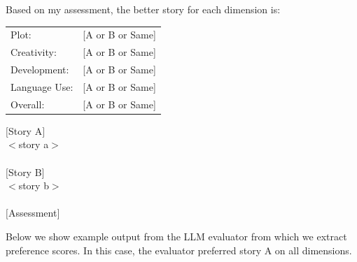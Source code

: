 \documentclass{article}
\begin{document}
\begin{tcolorbox}[colback=white, colframe=my-yellow, coltitle=black, parskip=5mm, title=
\textbf{\textsc{[LLM Evaluator]} Prompt Template}, breakable]
\begin{center}
Based on my assessment, the better story for each dimension is:\\

\medskip

\begin{tabular}{ll}
Plot: & [A or B or Same]\\
Creativity: & [A or B or Same]\\
Development: & [A or B or Same]\\
Language Use: & [A or B or Same]\\
Overall: & [A or B or Same]\\
\end{tabular}
\bigskip

$[$Story A$]$\\
$<$story a$>$\\
\quad \\
$[$Story B$]$\\
$<$story b$>$\\
\quad \\
$[$Assessment$]$
\end{center}
\end{tcolorbox}

Below we show example output from the LLM evaluator from which we extract preference scores. In this case,  the evaluator preferred story A on all dimensions. 
\end{document}
